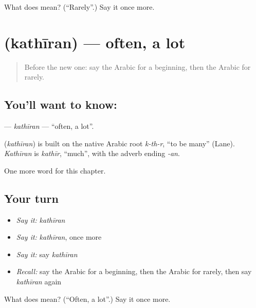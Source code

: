 \begin{tcolorbox}[breakable,colback=teal!4,colframe=teal!35!black,title={Before you move on}]
What does  mean? (\textquotedblleft{}Rarely\textquotedblright{}.) Say it once more.
\end{tcolorbox}
\section[\texorpdfstring{\ar{كثيرا} (kathīran)}{كثيرا (kathīran)}]{ (kathīran) — often, a lot}

\label{lesson:AR-C171-kathiran}



\begin{quote}
Before the new one: say the Arabic for a beginning, then the Arabic for rarely.
\end{quote}

\subsection*{You'll want to know: }
\textbf{} — \emph{kathīran} — \textquotedblleft{}often, a lot\textquotedblright{}.

\begin{cousinweb}
\textbf{} (\emph{kathīran}) is built on the native Arabic root \emph{k-th-r}, \textquotedblleft{}to be many\textquotedblright{} (Lane). \emph{Kathīran} is \emph{kathīr}, \textquotedblleft{}much\textquotedblright{}, with the adverb ending \emph{-an}.
\end{cousinweb}

\begin{grammarlens}[title={What you've built}]
One more word for this chapter.
\end{grammarlens}

\subsection*{Your turn}
\begin{itemize}
\raggedright
  \item \emph{Say it:} \emph{kathīran}
  \item \emph{Say it:} \emph{kathīran}, once more
  \item \emph{Say it:} say \emph{kathīran}
  \item \emph{Recall:} say the Arabic for a beginning, then the Arabic for rarely, then say \emph{kathīran} again
\end{itemize}

\begin{tcolorbox}[breakable,colback=teal!4,colframe=teal!35!black,title={Before you move on}]
What does  mean? (\textquotedblleft{}Often, a lot\textquotedblright{}.) Say it once more.
\end{tcolorbox}
